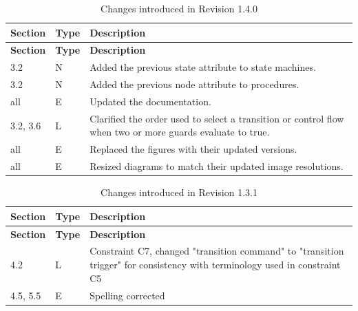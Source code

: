 \documentclass[definition]{../fwprofile}
\begin{document}
\begin{longtable}{|p{1.5cm}|p{1cm}|p{8cm}|}
\caption{Changes introduced in Revision 1.4.0}  \\
\hline
\rowcolor{light-gray}
\textbf{Section} & \textbf{Type} & \textbf{Description} \\
\hline\hline
\endfirsthead
\rowcolor{light-gray}
\textbf{Section} & \textbf{Type} & \textbf{Description} \\
\hline\hline
\endhead
3.2 & N & Added the previous state attribute to state machines. \\
\hline
3.2 & N & Added the previous node attribute to procedures. \\
\hline
all & E & Updated the documentation. \\
\hline
3.2, 3.6 & L & Clarified the order used to select a transition or control flow when two or more guards evaluate to true. \\
\hline
all & E & Replaced the figures with their updated versions. \\
\hline
all & E & Resized diagrams to match their updated image resolutions. \\
\hline
\end{longtable}

\begin{longtable}{|p{1.5cm}|p{1cm}|p{8cm}|}
\caption{Changes introduced in Revision 1.3.1}  \\
\hline
\rowcolor{light-gray}
\textbf{Section} & \textbf{Type} & \textbf{Description} \\
\hline\hline
\endfirsthead
\rowcolor{light-gray}
\textbf{Section} & \textbf{Type} & \textbf{Description} \\
\hline\hline
\endhead
4.2 & L & Constraint C7, changed "transition command" to "transition trigger" for consistency with terminology used in constraint C5\\
\hline
4.5, 5.5 & E & Spelling corrected\\
\hline
\end{longtable}
\end{document}
